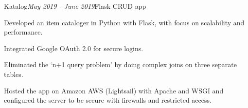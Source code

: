 \begin{rSubsection}{Katalog}{\em May 2019 - June 2019}{Flask CRUD app}{}
    \item Developed an item cataloger in Python with Flask, with focus on scalability and performance.
    \item Integrated Google OAuth 2.0 for secure logins.
    \item Eliminated the `n+1 query problem' by doing complex joins on three separate tables.
    \item Hosted the app on Amazon AWS (Lightsail) with Apache and WSGI and configured the server to be secure with firewalls and restricted access.
\end{rSubsection}
